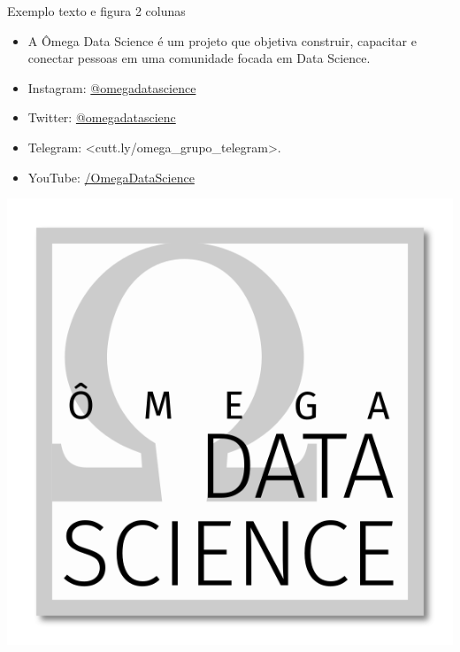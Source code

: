 \documentclass[
  ignorenonframetext,
  serif,
  professionalfont,
  usenames,
  dvipsnames,
  aspectratio = 169]{beamer}
\newif\ifbibliography
\providecommand{\tightlist}{%
  \setlength{\itemsep}{0pt}\setlength{\parskip}{0pt}}
\renewcommand{\tightlist}{%
  \setlength{\itemsep}{0\baselineskip}
  \setlength{\parskip}{0.25\baselineskip}
}
\def\beginAHalfColumn{\begin{minipage}{0.49\textwidth}}%
\def\endColumns{\end{minipage}}%
\begin{document}
\begin{frame}{Exemplo texto e figura 2 colunas}
\protect\hypertarget{exemplo-texto-e-figura-2-colunas}{}
\beginAHalfColumn

\begin{itemize}
\tightlist
\item
  A Ômega Data Science é um projeto que objetiva construir, capacitar e
  conectar pessoas em uma comunidade focada em Data Science.
\item
  Instagram:
  \href{https://instagram.com/omegadatascience}{@omegadatascience}
\item
  Twitter: \href{https://twitter.com/omegadatascienc}{@omegadatascienc}
\item
  Telegram: \textless cutt.ly/omega\_grupo\_telegram\textgreater.
\item
  YouTube:
  \href{https://youtube.com/OmegaDataScience}{/OmegaDataScience}
\end{itemize}

\endColumns
\beginAHalfColumn

\begin{center}\includegraphics[width=0.9\linewidth]{./img/omega-quadrado-sombra} \end{center}

\endColumns
\end{frame}

\begin{frame}[allowframebreaks]{}
  \bibliographytrue
  
\end{frame}
\end{document}
